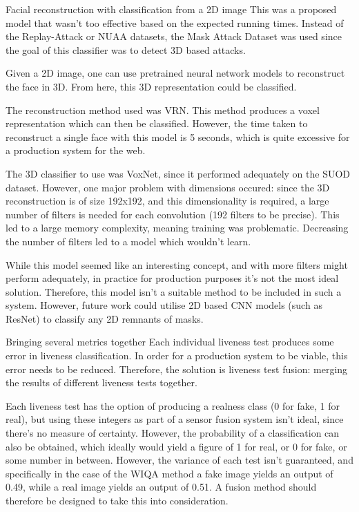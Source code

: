 \documentclass[final]{beamer}
\begin{document}
\begin{frame}{}
\begin{columns}[t]
\begin{column}{.48\linewidth}
        \begin{block}{Facial reconstruction with classification from a 2D image}
          This was a proposed model that wasn't too effective based on the expected running times. Instead of the Replay-Attack or NUAA datasets,
          the Mask Attack Dataset was used since the goal of this classifier was to detect 3D based attacks.

          Given a 2D image, one can use pretrained neural network models to reconstruct the face in 3D. From here, this 3D representation could be
          classified.

          The reconstruction method used was VRN. This method produces a voxel representation which can then be classified. However, the time taken to
          reconstruct a single face with this model is 5 seconds, which is quite excessive for a production system for the web.

          The 3D classifier to use was VoxNet, since it performed adequately on the SUOD dataset. However, one major problem with dimensions occured: since the 3D reconstruction
          is of size 192x192, and this dimensionality is required, a large number of filters is needed for each convolution (192 filters to be precise). This led to a large
          memory complexity, meaning training was problematic. Decreasing the number of filters led to a model which wouldn't learn.

          While this model seemed like an interesting concept, and with more filters might perform adequately, in practice for production purposes it's not the most ideal solution.
          Therefore, this model isn't a suitable method to be included in such a system. However, future work could utilise 2D based CNN models (such as ResNet) to classify any 2D remnants of
          masks.
          
        \end{block}

        \begin{block}{Bringing several metrics together}
          Each individual liveness test produces some error in liveness classification. In order for a production system to be viable, this error needs to be reduced. Therefore, the solution is
          liveness test fusion: merging the results of different liveness tests together.

          Each liveness test has the option of producing a realness class (0 for fake, 1 for real), but using these integers as part of a sensor fusion system isn't ideal, since there's no measure
          of certainty. However, the probability of a classification can also be obtained, which ideally would yield a figure of 1 for real, or 0 for fake, or some number in between. However, the variance
          of each test isn't guaranteed, and specifically in the case of the WIQA method a fake image yields an output of 0.49, while a real image yields an output of 0.51. A fusion method should therefore be designed
          to take this into consideration.


\end{block}
\end{column}
\end{columns}
\end{frame}
\end{document}
